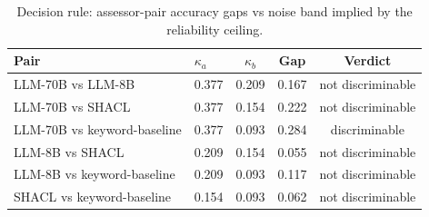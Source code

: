 \begin{table}[htbp]
\centering
\caption{Decision rule: assessor-pair accuracy gaps vs noise band implied by the reliability ceiling.}
\label{tab:decision_rule}
\begin{tabular}{llccc}
\toprule
Pair & $\kappa_a$ & $\kappa_b$ & Gap & Verdict \\
\midrule
LLM-70B vs LLM-8B & 0.377 & 0.209 & 0.167 & not discriminable \\
LLM-70B vs SHACL & 0.377 & 0.154 & 0.222 & not discriminable \\
LLM-70B vs keyword-baseline & 0.377 & 0.093 & 0.284 & discriminable \\
LLM-8B vs SHACL & 0.209 & 0.154 & 0.055 & not discriminable \\
LLM-8B vs keyword-baseline & 0.209 & 0.093 & 0.117 & not discriminable \\
SHACL vs keyword-baseline & 0.154 & 0.093 & 0.062 & not discriminable \\
\bottomrule
\end{tabular}
\end{table}
